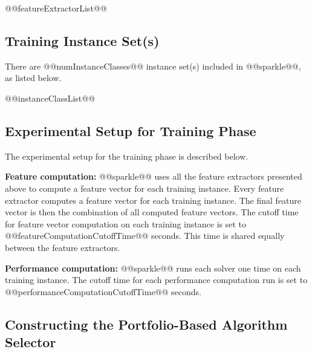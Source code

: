 \documentclass[british]{article}
\newif\iftest
\begin{document}
\begin{enumerate}
@@featureExtractorList@@
\end{enumerate}

\subsection{Training Instance Set(s)}
\label{sec:Train_Instance_Sets}
There are @@numInstanceClasses@@ instance set(s) included in @@sparkle@@, as listed below.

\begin{enumerate}
@@instanceClassList@@
\end{enumerate}

\iftest
\subsection{Test Instance Set}
\label{sec:Test_Instance_Set}

\begin{itemize}
\item Testing set: @@testInstanceClass@@, consisting of @@numInstanceInTestInstanceClass@@ instances
\end{itemize}
\fi

\subsection{Experimental Setup for Training Phase}
\label{sec:Experimental_Setup_for_Training_Phase}

The experimental setup for the training phase is described below.

\textbf{Feature computation:} @@sparkle@@ uses all the feature extractors presented above to compute a feature vector for each training instance. Every feature extractor computes a feature vector for each training instance. The final feature vector is then the combination of all computed feature vectors. The cutoff time for feature vector computation on each training instance is set to @@featureComputationCutoffTime@@ seconds. This time is shared equally between the feature extractors.

\textbf{Performance computation:} @@sparkle@@ runs each solver one time on each training instance. The cutoff time for each performance computation run is set to @@performanceComputationCutoffTime@@ seconds.

\subsection{Constructing the Portfolio-Based Algorithm Selector}
\label{sec:Portfolio}
\end{document}
